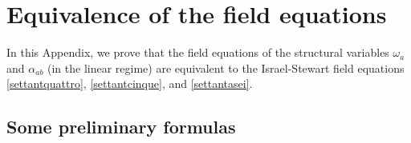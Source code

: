 \documentclass[a4paper, amsfonts, amssymb, amsmath, reprint, showkeys, nofootinbib, twoside, onecolumn, notitlepage]{revtex4-1}
\theoremstyle{definition}
\theoremstyle{theorem}
\begin{document}
%

\section{Equivalence of the field equations}\label{equiWuz}

In this Appendix, we prove that the field equations of the structural variables $\omega_a$ and $\alpha_{ab}$ (in the linear regime) are equivalent to the Israel-Stewart field equations \eqref{settantquattro}, \eqref{settantcinque}, and \eqref{settantasei}. 

\subsection{Some preliminary formulas}
\end{document}
